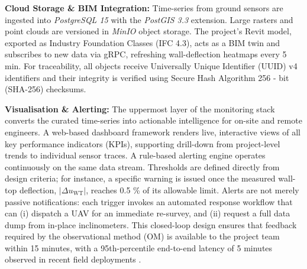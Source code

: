 \documentclass[preprint,11pt,authoryear,3p]{elsarticle}
\begin{document}
\textbf{Cloud Storage \& BIM Integration:} Time-series from ground sensors are ingested into \textit{PostgreSQL 15}\citep{PostgreSQL15} with the \textit{PostGIS 3.3}\citep{PostGIS33} extension. Large rasters and point clouds are versioned in \textit{MinIO}\citep{MinIO2022} object storage. The project's Revit model, exported as Industry Foundation Classes (IFC 4.3)\citep{IFC43}, acts as a BIM twin and subscribes to new data via gRPC, refreshing wall-deflection heatmaps every 5 min. For traceability, all objects receive Universally Unique Identifier (UUID) v4\citep{UUIDv4RFC} identifiers and their integrity is verified using Secure Hash Algorithm 256 - bit (SHA-256) \citep{SHA256FIPS180} checksums.

\textbf{Visualisation \& Alerting:} The uppermost layer of the monitoring stack converts the curated time-series into actionable intelligence for on-site and remote engineers. A web-based dashboard framework renders live, interactive views of all key performance indicators (KPIs), supporting drill-down from project-level trends to individual sensor traces. A rule-based alerting engine operates continuously on the same data stream. Thresholds are defined directly from design criteria; for instance, a specific warning is issued once the measured wall-top deflection, $\lvert\Delta u_{\text{WT}}\rvert$, reaches 0.5 \% of its allowable limit. Alerts are not merely passive notifications: each trigger invokes an automated response workflow that can (i) dispatch a UAV for an immediate re-survey, and (ii) request a full data dump from in-place inclinometers. This closed-loop design ensures that feedback required by the observational method (OM) is available to the project team within 15 minutes, with a 95th-percentile end-to-end latency of 5 minutes observed in recent field deployments \citep{LI2024107772}.
\end{document}
